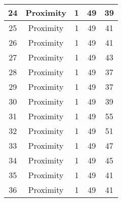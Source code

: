 \documentclass[results.tex]{subfiles}
\begin{document}
\begin{center}
\begin{tabular}{| c || c | c | c | c |}
            \hline
            24                      & Proximity                    & 1                      & 49                      & 39                   \\
            \hline
            25                      & Proximity                    & 1                      & 49                      & 41                   \\
            \hline
            26                      & Proximity                    & 1                      & 49                      & 41                   \\
            \hline
            27                      & Proximity                    & 1                      & 49                      & 43                   \\
            \hline
            28                      & Proximity                    & 1                      & 49                      & 37                   \\
            \hline
            29                      & Proximity                    & 1                      & 49                      & 37                   \\
            \hline
            30                      & Proximity                    & 1                      & 49                      & 39                   \\
            \hline
            31                      & Proximity                    & 1                      & 49                      & 55                   \\
            \hline
            32                      & Proximity                    & 1                      & 49                      & 51                   \\
            \hline
            33                      & Proximity                    & 1                      & 49                      & 47                   \\
            \hline
            34                      & Proximity                    & 1                      & 49                      & 45                   \\
            \hline
            35                      & Proximity                    & 1                      & 49                      & 41                   \\
            \hline
            36                      & Proximity                    & 1                      & 49                      & 41                   \\

\end{tabular}
\end{center}
\end{document}
